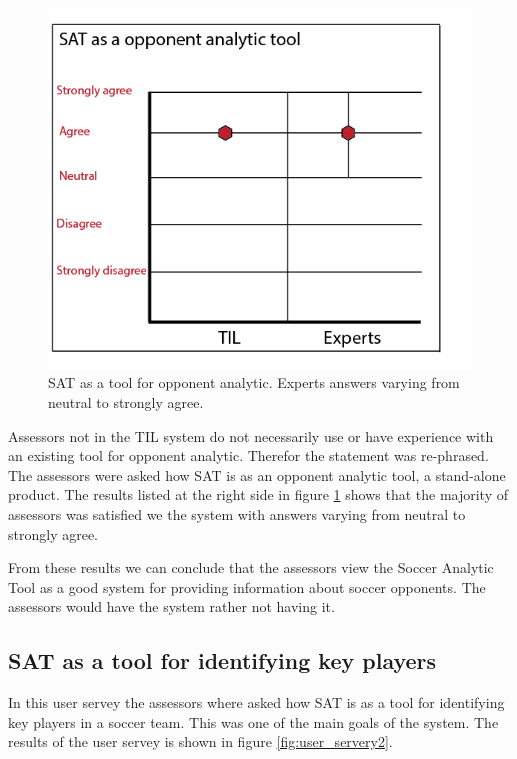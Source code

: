 \begin{figure}[H]
\centering
\includegraphics[width=1\textwidth]{images/evaluation/user_servery1}
\caption{SAT as a tool for opponent analytic. Experts answers varying from neutral to strongly agree.}
\label{fig:user_servey1}
\end{figure}

Assessors not in the \ac{TIL} system do not necessarily use or have experience with an existing tool for opponent analytic. Therefor the statement was re-phrased. The assessors were asked how SAT is as an opponent analytic tool, a stand-alone product. The results listed at the right side in figure \ref{fig:user_servey1} shows that the majority of assessors was satisfied we the system with answers varying from neutral to strongly agree.

From these results we can conclude that the assessors view the Soccer Analytic Tool as a good system for providing information about soccer opponents. The assessors would have the system rather not having it. 

\subsection{SAT as a tool for identifying key players}

In this user servey the assessors where asked how SAT is as a tool for identifying key players in a soccer team. This was one of the main goals of the system. The results of the user servey is shown in figure \ref{fig:user_servery2}. 

